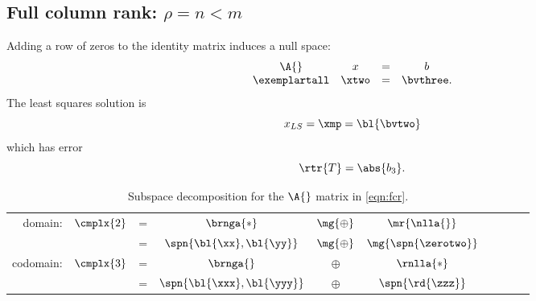 \subsection{Full column rank: $\rho = n < m$}  %
Adding a row of zeros to the identity matrix induces a null space:
  \begin{equation}
    \begin{array}{cccc}
      \A{} & x & = & b \\
      \exemplartall & \xtwo & = & \bvthree.
    \label{eqn:fcr}
    \end{array}
  \end{equation}
The least squares solution is
  \begin{equation*}   %
      x_{LS} = \xmp = \bl{\bvtwo}
  \end{equation*}
which has error
  \begin{equation*}   %
      \rtr{T} = \abs{b_{3}} .
  \end{equation*}

    \begin{table}[h!]
    	\caption[Subspace decomposition for \eqref{eqn:fcr}]{Subspace decomposition for the $\A{}$ matrix in \eqref{eqn:fcr}.}
    	\begin{center}
    		\begin{tabular}{rccccccccc}
    		  domain:   & $\cmplx{2}$ & = & $\brnga{*}$ & $\mg{\oplus}$ & $\mr{\nlla{}}$ \\
		                             && = & $\spn{\bl{\xx},\bl{\yy}}$   & $\mg{\oplus}$ & $\mg{\spn{\zerotwo}}$ \\[18pt]
    		  codomain: & $\cmplx{3}$ & = & $\brnga{}$ & $\oplus$ & $\rnlla{*}$ \\
		                             && = & $\spn{\bl{\xxx},\bl{\yyy}}$ & $\oplus$      & $\spn{\rd{\zzz}}$
    		\end{tabular}
    	\end{center}
    \end{table}%

